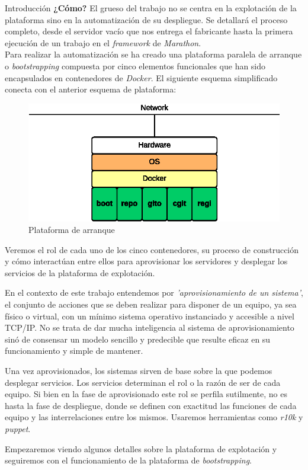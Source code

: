 \documentclass[a4paper,12pt,spanish,final]{epsc_tfc_pfc}
\begin{document}
\begin{intro}{Introducción}
\textbf{¿Cómo?} El grueso del trabajo no se centra en la explotación de la plataforma sino en la automatización de su despliegue. Se detallará el proceso completo, desde el servidor vacío que nos entrega el fabricante hasta la primera ejecución de un trabajo en el \emph{framework} de \emph{Marathon}.\\

Para realizar la automatización se ha creado una plataforma paralela de arranque o \emph{bootstrapping} compuesta por cinco elementos funcionales que han sido encapsulados en contenedores de \emph{Docker}. El siguiente esquema simplificado conecta con el anterior esquema de plataforma:

\begin{figure}[h]
  \centering
    \includegraphics[scale=1]{boot_platform}
      \caption{Plataforma de arranque}
\end{figure}

Veremos el rol de cada uno de los cinco contenedores, su proceso de construcción y cómo interactúan entre ellos para aprovisionar los servidores y desplegar los servicios de la plataforma de explotación.

En el contexto de este trabajo entendemos por \emph{'aprovisionamiento de un sistema'}, el conjunto de acciones que se deben realizar para disponer de un equipo, ya sea físico o virtual, con un mínimo sistema operativo instanciado y accesible a nivel TCP/IP\@. No se trata de dar mucha inteligencia al sistema de aprovisionamiento sinó de consensar un modelo sencillo y predecible que resulte eficaz en su funcionamiento y simple de mantener.

Una vez aprovisionados, los sistemas sirven de base sobre la que podemos desplegar servicios. Los servicios determinan el rol o la razón de ser de cada equipo. Si bien en la fase de aprovisionado este rol se perfila sutilmente, no es hasta la fase de despliegue, donde se definen con exactitud las funciones de cada equipo y las interrelaciones entre los mismos. Usaremos herramientas como \emph{r10k} y \emph{puppet}.

Empezaremos viendo algunos detalles sobre la plataforma de explotación y seguiremos con el funcionamiento de la plataforma de \emph{bootstrapping}.
\end{intro}
\end{document}
